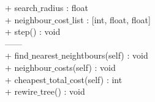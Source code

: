 {
+ search$\_$radius : float\\
+ neighbour$\_$cost$\_$list : [int, float, float]\\
}
{
 + step() : void \\
 
 ------\\
 
 + find$\_$nearest$\_$neightbours(self) : void\\
 + neighbour$\_$costs(self) : void \\ %
 + cheapest$\_$total$\_$cost(self) : int \\
 + rewire$\_$tree() : void \\

}